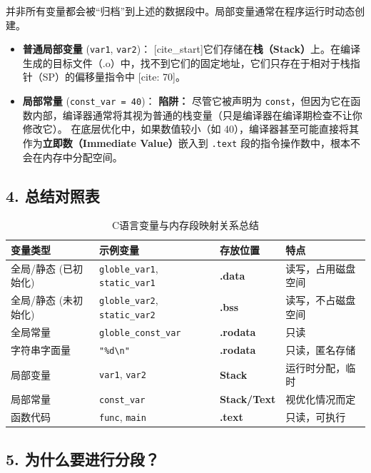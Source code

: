 并非所有变量都会被“归档”到上述的数据段中。局部变量通常在程序运行时动态创建。

\begin{itemize}
    \item \textbf{普通局部变量} (\texttt{var1}, \texttt{var2})：
    [cite\_start]它们存储在\textbf{栈（Stack）}上。在编译生成的目标文件（.o）中，找不到它们的固定地址，它们只存在于相对于栈指针（SP）的偏移量指令中 [cite: 70]。
    
    \item \textbf{局部常量} (\texttt{const\_var = 40})：
    \textbf{陷阱：} 尽管它被声明为 \texttt{const}，但因为它在函数内部，编译器通常将其视为普通的栈变量（只是编译器在编译期检查不让你修改它）。
    在底层优化中，如果数值较小（如 40），编译器甚至可能直接将其作为\textbf{立即数（Immediate Value）}嵌入到 \texttt{.text} 段的指令操作数中，根本不会在内存中分配空间。
\end{itemize}

\subsection{4. 总结对照表}

\begin{table}[h]
\centering
\begin{tabular}{|l|l|l|l|}
\hline
\textbf{变量类型} & \textbf{示例变量} & \textbf{存放位置} & \textbf{特点} \\ \hline
全局/静态 (已初始化) & \texttt{globle\_var1}, \texttt{static\_var1} & \textbf{.data} & 读写，占用磁盘空间 \\ \hline
全局/静态 (未初始化) & \texttt{globle\_var2}, \texttt{static\_var2} & \textbf{.bss} & 读写，不占磁盘空间 \\ \hline
全局常量 & \texttt{globle\_const\_var} & \textbf{.rodata} & 只读 \\ \hline
字符串字面量 & \texttt{"\%d\textbackslash{}n"} & \textbf{.rodata} & 只读，匿名存储 \\ \hline
局部变量 & \texttt{var1}, \texttt{var2} & \textbf{Stack} & 运行时分配，临时 \\ \hline
局部常量 & \texttt{const\_var} & \textbf{Stack/Text} & 视优化情况而定 \\ \hline
函数代码 & \texttt{func}, \texttt{main} & \textbf{.text} & 只读，可执行 \\ \hline
\end{tabular}
\caption{C语言变量与内存段映射关系总结}
\end{table}

\subsection{5. 为什么要进行分段？}

